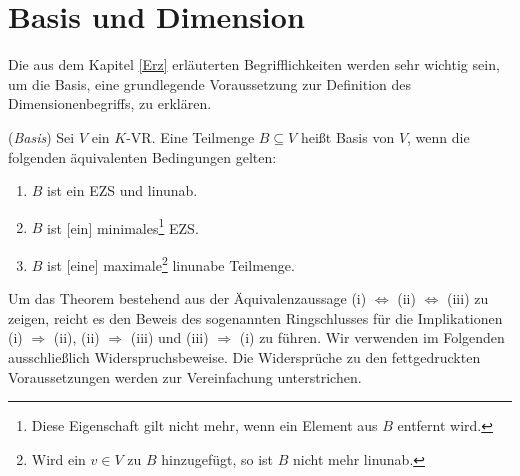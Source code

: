 \newpage
\section{Basis und Dimension}
\label{sec:Basis}
Die aus dem Kapitel \ref{Erz} erläuterten Begrifflichkeiten werden sehr wichtig sein, um die Basis, eine grundlegende Voraussetzung zur Definition des Dimensionenbegriffs, zu erklären.


\begin{theo}\cite[S. 41, 9.16]{Skript} \label{theo:Basis}(\emph{Basis}) \glqq Sei $V$ ein $K$-\acl{VR}. Eine Teilmenge $B \subseteq V$ heißt Basis von $V$, wenn die folgenden äquivalenten Bedingungen gelten:
		\begin{enumerate}
		\item \label{Basis1} $B$ ist ein \acl{EZS} und \acl{linunab}.
		\item \label{Basis2}$B$ ist [ein] minimales\footnote{Diese Eigenschaft gilt nicht mehr, wenn ein Element aus $B$ entfernt wird.} \acl{EZS}.
		\item \label{Basis3}$B$ ist [eine] maximale\footnote{Wird ein $v \in V$ zu $B$ hinzugefügt, so ist $B$ nicht mehr \acl{linunab}.} \acl{linunab}e Teilmenge.{\grqq}
		\end{enumerate}
\end{theo}

Um das Theorem bestehend aus der Äquivalenzaussage (i) $\Leftrightarrow$ (ii) $\Leftrightarrow$ (iii) zu zeigen, reicht es den Beweis des sogenannten Ringschlusses für die Implikationen (i) $\Rightarrow$ (ii), (ii) $\Rightarrow$ (iii) und (iii) $\Rightarrow$ (i) zu führen. Wir verwenden im Folgenden ausschließlich Widerspruchsbeweise. Die Widersprüche zu den fettgedruckten Voraussetzungen werden zur Vereinfachung unterstrichen.


